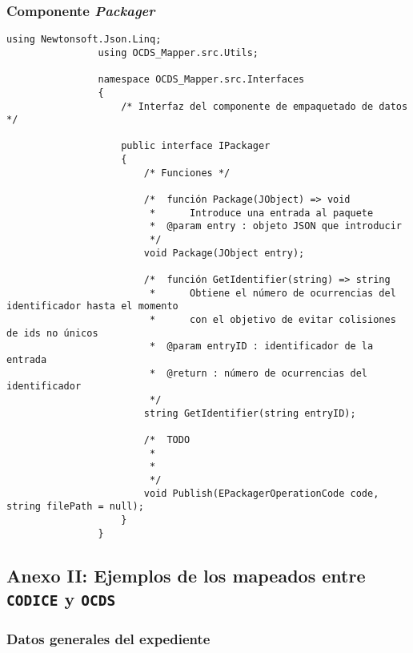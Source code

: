         \subsubsection{Componente \textit{Packager}}
            \begin{lstlisting}[language=lCSharp]
                using Newtonsoft.Json.Linq;
                using OCDS_Mapper.src.Utils;
                
                namespace OCDS_Mapper.src.Interfaces
                {
                    /* Interfaz del componente de empaquetado de datos  */
                
                    public interface IPackager
                    {
                        /* Funciones */
                
                        /*  función Package(JObject) => void
                         *      Introduce una entrada al paquete
                         *  @param entry : objeto JSON que introducir
                         */
                        void Package(JObject entry);
                
                        /*  función GetIdentifier(string) => string
                         *      Obtiene el número de ocurrencias del identificador hasta el momento
                         *      con el objetivo de evitar colisiones de ids no únicos
                         *  @param entryID : identificador de la entrada
                         *  @return : número de ocurrencias del identificador
                         */
                        string GetIdentifier(string entryID);
                
                        /*  TODO
                         *
                         *
                         */
                        void Publish(EPackagerOperationCode code, string filePath = null);
                    }
                }
            \end{lstlisting}
            
\newpage

    \subsection{Anexo II: Ejemplos de los mapeados entre \texttt{CODICE} y \texttt{OCDS}}

        \subsubsection{Datos generales del expediente}
